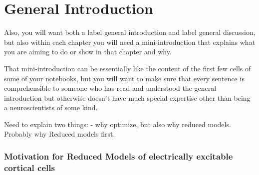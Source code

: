\documentclass{article}
\begin{document}
	
	

\chapter*{General Introduction}

\item Also, you will want both a label general introduction and label general discussion, but also within each chapter you will need a mini-introduction that explains what you are aiming to do or show in that chapter and why. 

\item That mini-introduction can be essentially like the content of the first few cells of some of your notebooks, but you will want to make sure that every sentence is comprehensible to someone who has read and understood the general introduction but otherwise doesn’t have much special expertise other than being a neuroscientists of some kind.


Need to explain two things:
- why optimize, but also why reduced models. Probably why Reduced models first.
\subsection*{Motivation for Reduced Models of electrically excitable cortical cells}
\end{document}
